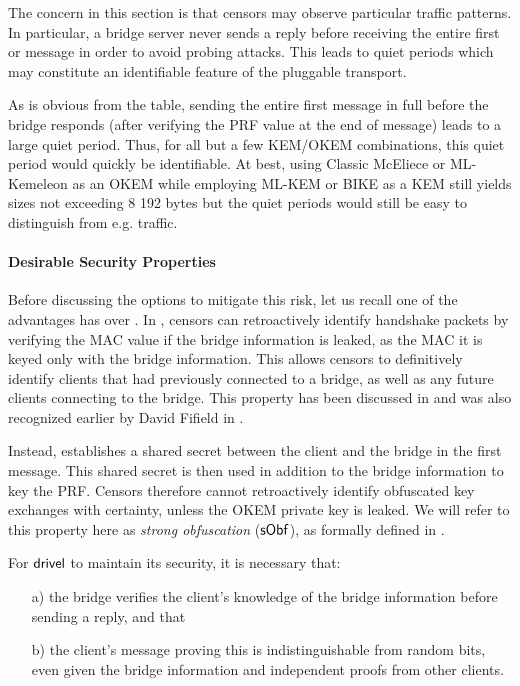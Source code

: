 The concern in this section is that censors may observe particular traffic patterns. In particular, a bridge server never sends a reply before receiving the entire first \drivel{} or \obfsfour{} message in order to avoid probing attacks. This leads to quiet periods which may constitute an identifiable feature of the pluggable transport.

As is obvious from the table, sending the entire first \drivel{} message in full before the bridge responds (after verifying the PRF value at the end of message) leads to a large quiet period. Thus, for all but a few KEM/OKEM combinations, this quiet period would quickly be identifiable. At best, using Classic McEliece or ML-Kemeleon as an OKEM while employing ML-KEM or BIKE as a KEM still yields sizes not exceeding 8 192 bytes but the quiet periods would still be easy to distinguish from e.g. \obfsfour{} traffic.

\paragraph{Desirable Security Properties}
Before discussing the options to mitigate this risk, let us recall one of the advantages \drivel{} has over \obfsfour{}. In \obfsfour{}, censors can retroactively identify handshake packets by verifying the MAC value if the bridge information is leaked, as the MAC it is keyed only with the bridge information. This allows censors to definitively identify clients that had previously connected to a bridge, as well as any future clients connecting to the bridge. This property has been discussed in \cite[Section~6]{CCS:GunSteVei24} and was also recognized earlier by David Fifield in \cite{obfs4-pk-reveal-distinguisher}.

Instead, \drivel{} establishes a shared secret between the client and the bridge in the first message. This shared secret is then used in addition to the bridge information to key the PRF. Censors therefore cannot retroactively identify obfuscated key exchanges with certainty, unless the OKEM private key is leaked. We will refer to this property here as \emph{strong obfuscation} ($\mathsf{sObf}$), as formally defined in \cite{CCS:GunSteVei24}.

For $\textsf{drivel}$ to maintain its security, it is necessary that:
\begin{itemize}
    \item[a)] the bridge verifies the client's knowledge of the bridge information before sending a reply, and that
    \item[b)] the client's message proving this is indistinguishable from random bits, even given the bridge information and independent proofs from other clients.
\end{itemize}

